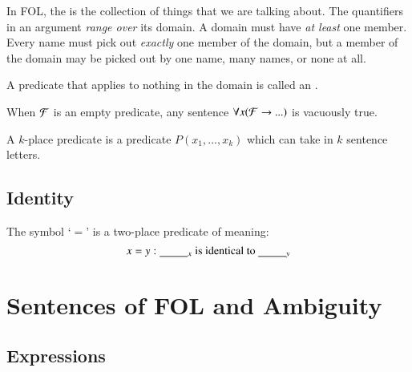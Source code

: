 \documentclass[12pt, a4paper, twoside, openright, titlepage]{book}
\begin{document}
\begin{defn}{}{}
    In FOL, the  is the collection of things that we are talking about. The quantifiers in an argument \emph{range over} its domain. A domain must have \emph{at least} one member. Every name must pick out \emph{exactly} one member of the domain, but a member of the domain may be picked out by one name, many names, or none at all.
\end{defn}

\begin{defn}{}{}
    A predicate that applies to nothing in the domain is called an .
\end{defn}

\begin{rmk}{}{}
    When $\mathcal{F}$ is an empty predicate, any sentence $\forall x(\mathcal{F}\rightarrow...)$ is vacuously true.
\end{rmk}

\begin{defn}{}{}
    A $k$-place predicate is a predicate $P(x_1,...,x_k)$ which can take in $k$ sentence letters.
\end{defn}

\section{\textsection Identity}

\begin{defn}{}{}
    The symbol `$=$' is a two-place predicate of meaning: \begin{equation*}
        x=y: \text{\underline{\hspace*{2.5em}}$_{x}$ is identical to \underline{\hspace*{2.5em}}$_{y}$}
    \end{equation*}
\end{defn}


\chapter{\textsection\textsection Sentences of FOL and Ambiguity}

\section{\textsection Expressions}
\end{document}
